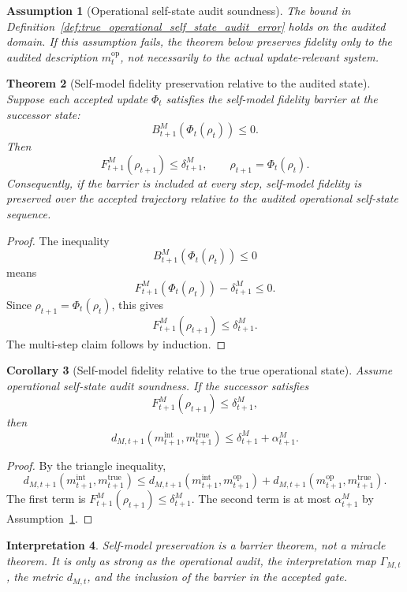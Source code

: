 \documentclass[11pt]{article}
\newtheorem{theorem}{Theorem}[section]
\newtheorem{corollary}[theorem]{Corollary}
\newtheorem{assumption}[theorem]{Assumption}
\newtheorem{interpretation}[theorem]{Interpretation}
\newcommand{\1}{\mathbf{1}}
\providecommand{\true}{\mathrm{true}}
\begin{document}
\begin{assumption}[Operational self-state audit soundness]
\label{ass:operational_self_state_audit_soundness}
The bound in Definition~\ref{def:true_operational_self_state_audit_error} holds on the audited domain.  If this assumption fails, the theorem below preserves fidelity only to the audited description \(m_t^{\mathrm{op}}\), not necessarily to the actual update-relevant system.
\end{assumption}

\begin{theorem}[Self-model fidelity preservation relative to the audited state]
\label{thm:self_model_fidelity_preservation}
Suppose each accepted update \(\Phi_t\) satisfies the self-model fidelity barrier at the successor state:
\[
B^M_{t+1}(\Phi_t(\rho_t))\le0.
\]
Then
\[
F^M_{t+1}(\rho_{t+1})
\le
\delta^M_{t+1},
\qquad
\rho_{t+1}=\Phi_t(\rho_t).
\]
Consequently, if the barrier is included at every step, self-model fidelity is preserved over the accepted trajectory relative to the audited operational self-state sequence.
\end{theorem}

\begin{proof}
The inequality
\[
B^M_{t+1}(\Phi_t(\rho_t))\le0
\]
means
\[
F^M_{t+1}(\Phi_t(\rho_t))-\delta^M_{t+1}\le0.
\]
Since \(\rho_{t+1}=\Phi_t(\rho_t)\), this gives
\[
F^M_{t+1}(\rho_{t+1})\le\delta^M_{t+1}.
\]
The multi-step claim follows by induction.
\end{proof}

\begin{corollary}[Self-model fidelity relative to the true operational state]
\label{cor:self_model_fidelity_true_state}
Assume operational self-state audit soundness.  If the successor satisfies
\[
F^M_{t+1}(\rho_{t+1})\le\delta^M_{t+1},
\]
then
\[
d_{M,t+1}(m_{t+1}^{\mathrm{int}},m_{t+1}^{\true})
\le
\delta^M_{t+1}+\alpha^M_{t+1}.
\]
\end{corollary}

\begin{proof}
By the triangle inequality,
\[
d_{M,t+1}(m_{t+1}^{\mathrm{int}},m_{t+1}^{\true})
\le
d_{M,t+1}(m_{t+1}^{\mathrm{int}},m_{t+1}^{\mathrm{op}})
+
d_{M,t+1}(m_{t+1}^{\mathrm{op}},m_{t+1}^{\true}).
\]
The first term is \(F^M_{t+1}(\rho_{t+1})\le\delta^M_{t+1}\).  The second term is at most \(\alpha^M_{t+1}\) by Assumption~\ref{ass:operational_self_state_audit_soundness}.
\end{proof}

\begin{interpretation}
Self-model preservation is a barrier theorem, not a miracle theorem.  It is only as strong as the operational audit, the interpretation map \(\Gamma_{M,t}\), the metric \(d_{M,t}\), and the inclusion of the barrier in the accepted gate.
\end{interpretation}
\end{document}
